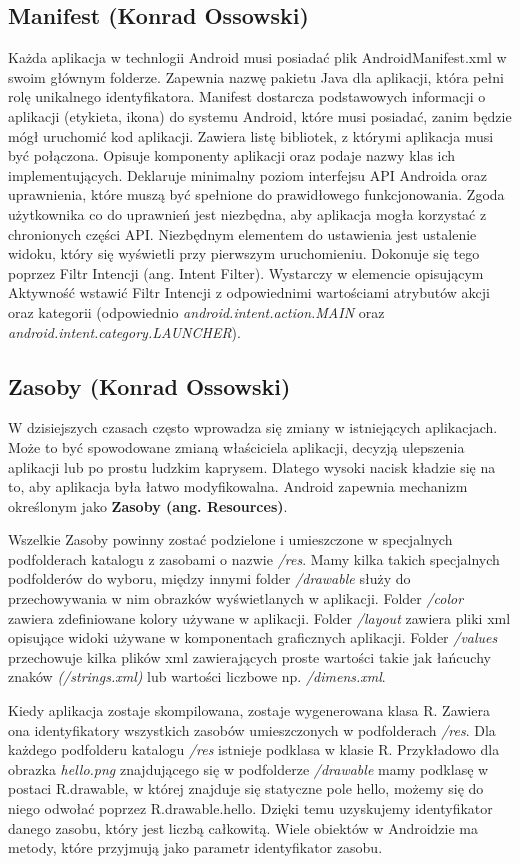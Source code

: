 \subsection{Manifest (Konrad Ossowski)}
Każda aplikacja w technlogii Android musi posiadać plik AndroidManifest.xml w swoim głównym folderze. Zapewnia nazwę pakietu Java dla aplikacji, która pełni rolę unikalnego identyfikatora. Manifest dostarcza podstawowych informacji o aplikacji (etykieta, ikona) do systemu Android, które musi posiadać, zanim będzie mógł uruchomić kod aplikacji.  Zawiera listę bibliotek, z którymi aplikacja musi być połączona. Opisuje komponenty aplikacji oraz podaje nazwy klas ich implementujących. Deklaruje minimalny poziom interfejsu API Androida oraz uprawnienia, które muszą być spełnione do prawidłowego funkcjonowania. Zgoda użytkownika co do uprawnień jest niezbędna, aby aplikacja mogła korzystać z chronionych części API. Niezbędnym elementem do ustawienia jest ustalenie widoku, który się wyświetli przy pierwszym uruchomieniu. Dokonuje się tego poprzez Filtr Intencji (ang. Intent Filter). Wystarczy w elemencie opisującym Aktywność wstawić Filtr Intencji z odpowiednimi wartościami atrybutów akcji oraz kategorii (odpowiednio \textit{android.intent.action.MAIN} oraz \textit{android.intent.category.LAUNCHER}).\cite{manifest}
\subsection{Zasoby (Konrad Ossowski)}
W dzisiejszych czasach często wprowadza się zmiany w istniejących aplikacjach. Może to być spowodowane zmianą właściciela aplikacji, decyzją ulepszenia aplikacji lub po prostu ludzkim kaprysem. Dlatego wysoki nacisk kładzie się na to, aby aplikacja była łatwo modyfikowalna. Android zapewnia mechanizm określonym jako \textbf{Zasoby (ang. Resources)}.\par Wszelkie Zasoby powinny zostać podzielone i umieszczone w specjalnych podfolderach katalogu z zasobami o nazwie \textit{/res}. Mamy kilka takich specjalnych podfolderów do wyboru, między innymi folder \textit{/drawable} służy do przechowywania w nim obrazków wyświetlanych w aplikacji. Folder \textit{/color} zawiera zdefiniowane kolory używane w aplikacji. Folder \textit{/layout} zawiera pliki xml opisujące widoki używane w komponentach graficznych aplikacji. Folder \textit{/values} przechowuje kilka plików xml zawierających proste wartości takie jak łańcuchy znaków \textit{(/strings.xml)} lub wartości liczbowe np. \textit{/dimens.xml}.\cite{providing_resources}\par Kiedy aplikacja zostaje skompilowana, zostaje wygenerowana klasa R. Zawiera ona identyfikatory wszystkich zasobów umieszczonych w podfolderach \textit{/res}. Dla każdego podfolderu katalogu \textit{/res} istnieje podklasa w klasie R. Przykładowo dla obrazka \textit{hello.png} znajdującego się w podfolderze \textit{/drawable} mamy podklasę w postaci R.drawable, w której znajduje się statyczne pole hello, możemy się do niego odwołać poprzez R.drawable.hello. Dzięki temu uzyskujemy identyfikator danego zasobu, który jest liczbą całkowitą. Wiele obiektów w Androidzie ma metody, które przyjmują jako parametr identyfikator zasobu.\cite{accessing_resources}

